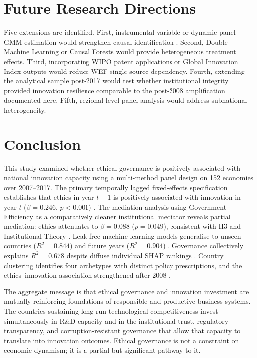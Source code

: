 \documentclass[pdflatex,sn-apa]{sn-jnl}
\begin{document}
\section{Future Research Directions}
\label{sec:future}

Five extensions are identified. First, instrumental variable or dynamic panel GMM estimation would strengthen causal identification \citep{wooldridge2010}. Second, Double Machine Learning \citep{chernozhukov2018} or Causal Forests \citep{athey2019} would provide heterogeneous treatment effects. Third, incorporating WIPO patent applications or Global Innovation Index outputs would reduce WEF single-source dependency. Fourth, extending the analytical sample post-2017 would test whether institutional integrity provided innovation resilience comparable to the post-2008 amplification documented here. Fifth, regional-level panel analysis would address subnational heterogeneity.

\section{Conclusion}
\label{sec:conclusion}

This study examined whether ethical governance is positively associated with national innovation capacity using a multi-method panel design on 152 economies over 2007--2017. The primary temporally lagged fixed-effects specification establishes that ethics in year $t-1$ is positively associated with innovation in year $t$ ($\beta=0.246$, $p<0.001$) \citep{baltagi2005,wooldridge2010,hsiao2014}. The mediation analysis using Government Efficiency as a comparatively cleaner institutional mediator reveals partial mediation: ethics attenuates to $\beta=0.088$ ($p=0.049$), consistent with H3 and Institutional Theory \citep{north1990,scott2001}. Leak-free machine learning models generalise to unseen countries ($R^2=0.844$) and future years ($R^2=0.904$) \citep{wef2017}. Governance collectively explains $R^2=0.678$ despite diffuse individual SHAP rankings \citep{lundberg2017}. Country clustering identifies four archetypes with distinct policy prescriptions, and the ethics--innovation association strengthened after 2008 \citep{acemoglu2012}.

The aggregate message is that ethical governance and innovation investment are mutually reinforcing foundations of responsible and productive business systems. The countries sustaining long-run technological competitiveness invest simultaneously in R\&D capacity and in the institutional trust, regulatory transparency, and corruption-resistant governance that allow that capacity to translate into innovation outcomes. Ethical governance is not a constraint on economic dynamism; it is a partial but significant pathway to it.
\end{document}
